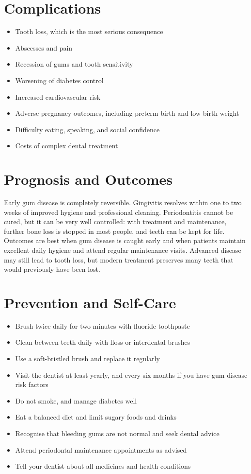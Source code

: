 \section*{Complications}
\begin{itemize}
    \item Tooth loss, which is the most serious consequence
    \item Abscesses and pain
    \item Recession of gums and tooth sensitivity
    \item Worsening of diabetes control
    \item Increased cardiovascular risk
    \item Adverse pregnancy outcomes, including preterm birth and low birth weight
    \item Difficulty eating, speaking, and social confidence
    \item Costs of complex dental treatment
\end{itemize}

\section*{Prognosis and Outcomes}
Early gum disease is completely reversible. Gingivitis resolves within one to two weeks of improved hygiene and professional cleaning. Periodontitis cannot be cured, but it can be very well controlled: with treatment and maintenance, further bone loss is stopped in most people, and teeth can be kept for life. Outcomes are best when gum disease is caught early and when patients maintain excellent daily hygiene and attend regular maintenance visits. Advanced disease may still lead to tooth loss, but modern treatment preserves many teeth that would previously have been lost.

\section*{Prevention and Self-Care}
\begin{itemize}
    \item Brush twice daily for two minutes with fluoride toothpaste
    \item Clean between teeth daily with floss or interdental brushes
    \item Use a soft-bristled brush and replace it regularly
    \item Visit the dentist at least yearly, and every six months if you have gum disease risk factors
    \item Do not smoke, and manage diabetes well
    \item Eat a balanced diet and limit sugary foods and drinks
    \item Recognise that bleeding gums are not normal and seek dental advice
    \item Attend periodontal maintenance appointments as advised
    \item Tell your dentist about all medicines and health conditions
\end{itemize}

